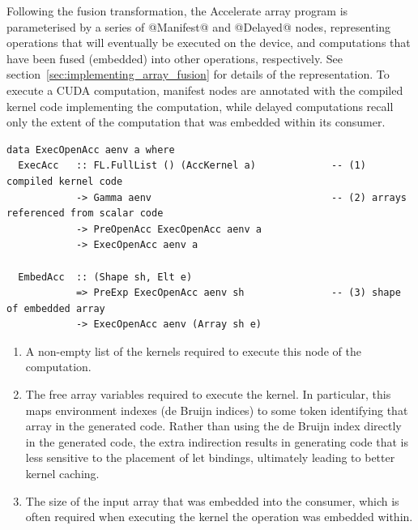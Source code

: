 Following the fusion transformation, the Accelerate array program is
parameterised by a series of @Manifest@ and @Delayed@ nodes,
representing operations that will eventually be executed on the device, and
computations that have been fused (embedded) into other operations,
respectively. See section~\ref{sec:implementing_array_fusion} for details of the
representation. To execute a CUDA computation, manifest nodes are annotated with
the compiled kernel code implementing the computation, while delayed
computations recall only the extent of the computation that was embedded within
its consumer.
%
\begin{lstlisting}[style=haskell]
data ExecOpenAcc aenv a where
  ExecAcc   :: FL.FullList () (AccKernel a)             -- (1) compiled kernel code
            -> Gamma aenv                               -- (2) arrays referenced from scalar code
            -> PreOpenAcc ExecOpenAcc aenv a
            -> ExecOpenAcc aenv a

  EmbedAcc  :: (Shape sh, Elt e)
            => PreExp ExecOpenAcc aenv sh               -- (3) shape of embedded array
            -> ExecOpenAcc aenv (Array sh e)
\end{lstlisting}
%
\begin{enumerate}
\item A non-empty list of the kernels required to execute this node of the
    computation.

\item The free array variables required to execute the kernel. In particular,
    this maps environment indexes (de Bruijn indices) to some token identifying
    that array in the generated code. Rather than using the de Bruijn index
    directly in the generated code, the extra indirection results in generating
    code that is less sensitive to the placement of let bindings, ultimately
    leading to better kernel caching.

\item The size of the input array that was embedded into the consumer, which is
    often required when executing the kernel the operation was embedded within.
\end{enumerate}

